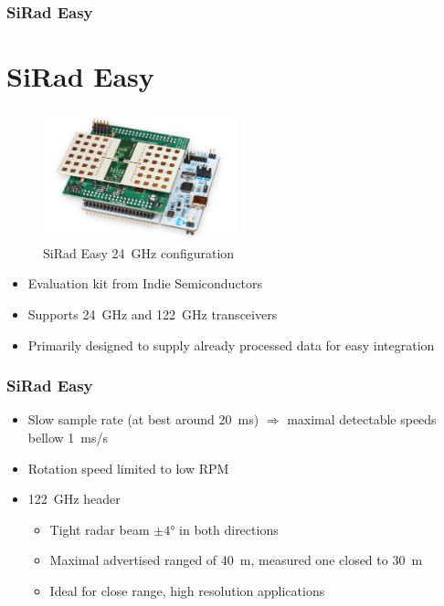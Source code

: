 \documentclass[aspectratio=43]{beamer}
\begin{document}
\begin{frame}[fragile]
  \frametitle{SiRad Easy}
  \section{SiRad Easy}

  \begin{figure}[h!]
    \centering
    \includegraphics[width=0.5\textwidth]{../img/sirad.png}

    \caption{SiRad Easy  24~GHz configuration }
    \label{fig:sirad}
  \end{figure}

  \begin{itemize}
    \item Evaluation kit from Indie Semiconductors
    \item Supports 24~GHz and 122~GHz transceivers
    \item Primarily designed to supply already processed data for easy integration
  \end{itemize}
\end{frame}

\begin{frame}[fragile]
  \frametitle{SiRad Easy}

  \begin{itemize}
    \item Slow sample rate (at best around 20~ms) $\Rightarrow$ maximal detectable speeds bellow 1~ms/s
    \item Rotation speed limited to low RPM
    \item 122~GHz header
      \begin{itemize}
        \item Tight radar beam $\pm 4$° in both directions
        \item Maximal advertised ranged of 40~m, measured one closed to 30~m
        \item Ideal for close range, high resolution applications
      \end{itemize}
  \end{itemize}
\end{frame}
\end{document}
